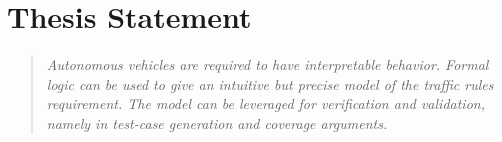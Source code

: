 \section{Thesis Statement}



\begin{quote}
\textit{
    Autonomous vehicles are required to have interpretable behavior. Formal logic can be used to give an intuitive but precise model of the traffic rules requirement. The model can be leveraged for verification and validation, namely in test-case generation and coverage arguments.
}
\end{quote}